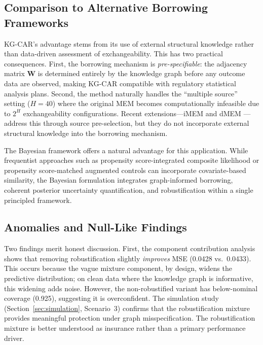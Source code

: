 \documentclass[12pt]{article}
\newcommand{\bW}{\mathbf{W}}
\begin{document}
\subsection{Comparison to Alternative Borrowing Frameworks}
\label{sec:disc_comparison}

KG-CAR's advantage stems from its use of external structural knowledge rather than data-driven assessment of exchangeability. This has two practical consequences. First, the borrowing mechanism is \emph{pre-specifiable}: the adjacency matrix $\bW$ is determined entirely by the knowledge graph before any outcome data are observed, making KG-CAR compatible with regulatory statistical analysis plans. Second, the method naturally handles the ``multiple source'' setting ($H = 40$) where the original MEM \citep{kaizer2018bayesian} becomes computationally infeasible due to $2^H$ exchangeability configurations. Recent extensions---iMEM \citep{kaizer2021bayesian} and dMEM \citep{ji2022data}---address this through source pre-selection, but they do not incorporate external structural knowledge into the borrowing mechanism.

The Bayesian framework offers a natural advantage for this application. While frequentist approaches such as propensity score-integrated composite likelihood \citep{wang2020propensity} or propensity score-matched augmented controls \citep{lin2018propensity} can incorporate covariate-based similarity, the Bayesian formulation integrates graph-informed borrowing, coherent posterior uncertainty quantification, and robustification within a single principled framework.

\subsection{Anomalies and Null-Like Findings}
\label{sec:disc_anomalies}

Two findings merit honest discussion. First, the component contribution analysis shows that removing robustification slightly \emph{improves} MSE (0.0428 vs.\ 0.0433). This occurs because the vague mixture component, by design, widens the predictive distribution; on clean data where the knowledge graph is informative, this widening adds noise. However, the non-robustified variant has below-nominal coverage (0.925), suggesting it is overconfident. The simulation study (Section~\ref{sec:simulation}, Scenario~3) confirms that the robustification mixture provides meaningful protection under graph misspecification. The robustification mixture is better understood as insurance rather than a primary performance driver.
\end{document}
